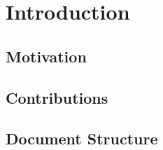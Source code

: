 \chapter{Introduction} \label{chap:introduction}

\section{Motivation}
\lipsum

\section{Contributions}

\section{Document Structure}
